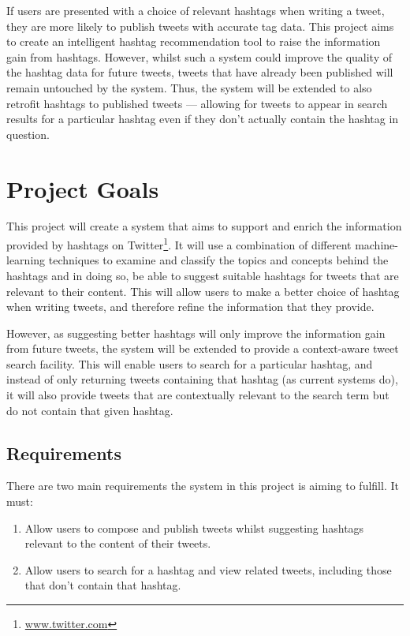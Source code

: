\documentclass[12pt,a4paper]{article}
\begin{document}
If users are presented with a choice of relevant hashtags when writing a tweet, they are more likely to publish tweets with accurate tag data. This project aims to create an intelligent hashtag recommendation tool to raise the information gain from hashtags. However, whilst such a system could improve the quality of the hashtag data for future tweets, tweets that have already been published will remain untouched by the system. Thus, the system will be extended to also retrofit hashtags to published tweets --- allowing for tweets to appear in search results for a particular hashtag even if they don't actually contain the hashtag in question.
\pagebreak

\tableofcontents
\pagebreak

\section{Project Goals}
This project will create a system that aims to support and enrich the information provided by hashtags on Twitter\footnote{\url{www.twitter.com}}. It will use a combination of different machine-learning techniques to examine and classify the topics and concepts behind the hashtags and in doing so, be able to suggest suitable hashtags for tweets that are relevant to their content. This will allow users to make a better choice of hashtag when writing tweets, and therefore refine the information that they provide.

However, as suggesting better hashtags will only improve the information gain from future tweets, the system will be extended to provide a context-aware tweet search facility. This will enable users to search for a particular hashtag, and instead of only returning tweets containing that hashtag (as current systems do), it will also provide tweets that are contextually relevant to the search term but do not contain that given hashtag.

\subsection{Requirements}
There are two main requirements the system in this project is aiming to fulfill. It must:
\begin{enumerate}
    \item Allow users to compose and publish tweets whilst suggesting hashtags relevant to the content of their tweets.
    \item Allow users to search for a hashtag and view related tweets, including those that don't contain that hashtag.
\end{enumerate}
\end{document}

